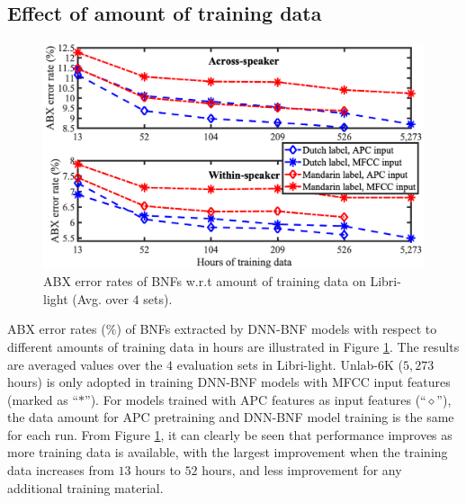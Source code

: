 \documentclass[a4paper]{article}
\begin{document}
\subsection{Effect of amount of training data}
\begin{figure}[!t]
    \centering
    \includegraphics[width=0.91\linewidth]{LaTeX/crsling_dnn_bnf_apc_input_vert_no_prefix_adt_apc_across_9.36_hori_no_hrs.png}
    \caption{ABX error rates of BNFs w.r.t amount of training data on Libri-light (Avg. over $4$ sets).}
    \label{fig:dnn_bnf_data_amount}
\end{figure}

ABX error rates ($\%$) of BNFs extracted by  DNN-BNF models with respect to different amounts of training data in hours are illustrated in Figure \ref{fig:dnn_bnf_data_amount}. The results are averaged values over the $4$ evaluation sets in  Libri-light. Unlab-6K ($5,273$ hours)  is only adopted in training DNN-BNF models with MFCC input features (marked as ``$\ast$''). For models trained with APC features as input features (``$\diamond$''), the  data amount for APC pretraining and DNN-BNF model training   is the same for each run.  From Figure \ref{fig:dnn_bnf_data_amount}, it can clearly be seen that 
performance improves as more training data is available, with the largest improvement when the training data increases from $13$  hours  to $52$ hours, and less improvement for any additional training material.
\end{document}
